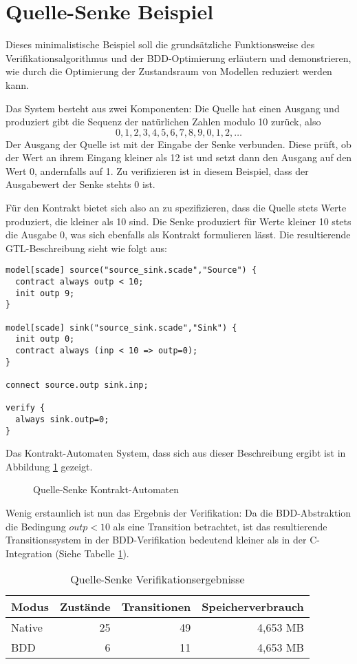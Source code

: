 \section{Quelle-Senke Beispiel}
Dieses minimalistische Beispiel soll die grundsätzliche Funktionsweise des Verifikationsalgorithmus und der BDD-Optimierung erläutern und demonstrieren, wie durch die Optimierung der Zustandsraum von Modellen reduziert werden kann.

Das System besteht aus zwei Komponenten:
Die Quelle hat einen Ausgang und produziert gibt die Sequenz der natürlichen Zahlen modulo 10 zurück, also
\[ 0,1,2,3,4,5,6,7,8,9,0,1,2,\dots \]
Der Ausgang der Quelle ist mit der Eingabe der Senke verbunden.
Diese prüft, ob der Wert an ihrem Eingang kleiner als 12 ist und setzt dann den Ausgang auf den Wert 0, andernfalls auf 1.
Zu verifizieren ist in diesem Beispiel, dass der Ausgabewert der Senke stehts 0 ist.

Für den Kontrakt bietet sich also an zu spezifizieren, dass die Quelle stets Werte produziert, die kleiner als 10 sind.
Die Senke produziert für Werte kleiner 10 stets die Ausgabe 0, was sich ebenfalls als Kontrakt formulieren lässt.
Die resultierende GTL-Beschreibung sieht wie folgt aus:
\begin{lstlisting}[language=gtl]
model[scade] source("source_sink.scade","Source") {
  contract always outp < 10;
  init outp 9;
}

model[scade] sink("source_sink.scade","Sink") {
  init outp 0;
  contract always (inp < 10 => outp=0);
}

connect source.outp sink.inp;

verify {
  always sink.outp=0;
}
\end{lstlisting}
Das Kontrakt-Automaten System, dass sich aus dieser Beschreibung ergibt ist in Abbildung \ref{fig:source_sink_automata} gezeigt.

\begin{figure}[h]
  \centering
  \begin{tikzpicture}
    
  \end{tikzpicture}
  \caption{Quelle-Senke Kontrakt-Automaten}
  \label{fig:source_sink_automata}
\end{figure}

Wenig erstaunlich ist nun das Ergebnis der Verifikation:
Da die BDD-Abstraktion die Bedingung $\mathit{outp}<10$ als eine Transition betrachtet, ist das resultierende Transitionssystem in der BDD-Verifikation bedeutend kleiner als in der C-Integration (Siehe Tabelle \ref{tab:source_sink_verifikation}).

\begin{table}
  \begin{tabular}{|l|r|r|r|}
    \hline
    \textbf{Modus} & \textbf{Zustände} & \textbf{Transitionen} & \textbf{Speicherverbrauch}\\
    \hline
    Native & 25 & 49 & 4,653 MB\\
    BDD & 6 & 11 & 4,653 MB\\
    \hline
  \end{tabular}
  \caption{Quelle-Senke Verifikationsergebnisse}
  \label{tab:source_sink_verifikation}
\end{table}
